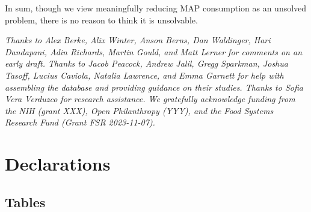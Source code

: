 \documentclass[sn-nature,referee,pdflatex]{sn-jnl}
\begin{document}
In sum, though we view meaningfully reducing MAP consumption as an
unsolved problem, there is no reason to think it is unsolvable.


\emph{Thanks to Alex Berke, Alix Winter, Anson Berns, Dan Waldinger,
Hari Dandapani, Adin Richards, Martin Gould, and Matt Lerner for
comments on an early draft. Thanks to Jacob Peacock, Andrew Jalil, Gregg
Sparkman, Joshua Tasoff, Lucius Caviola, Natalia Lawrence, and Emma
Garnett for help with assembling the database and providing guidance on
their studies. Thanks to Sofia Vera Verduzco for research assistance. We
gratefully acknowledge funding from the NIH (grant XXX), Open
Philanthropy (YYY), and the Food Systems Research Fund (Grant FSR
2023-11-07).}

\section*{Declarations}\label{declarations}

\newpage

\subsection{Tables}\label{tables}
\end{document}

